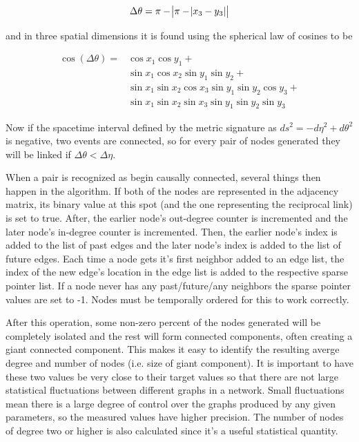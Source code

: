 \documentclass[preprint,notitlepage,amsmath,amssymb,floatfix]{revtex4-1}
\begin{document}
\begin{equation}
\Delta\theta = \pi - \abs{\pi - \abs{x_3 - y_3}}
\end{equation}

\noindent and in three spatial dimensions it is found using the spherical law of cosines to be

\begin{equation}
\begin{split}
\cos\left(\Delta\theta\right) = &\cos x_1\cos y_1 + \\
  &\sin x_1\cos x_2\sin y_1\sin y_2 + \\
  &\sin x_1\sin x_2\cos x_3\sin y_1\sin y_2\cos y_3 + \\
  &\sin x_1\sin x_2\sin x_3\sin y_1\sin y_2\sin y_3
\end{split}
\end{equation}

\noindent Now if the spacetime interval defined by the metric signature as $ds^2 = -d\eta^2 + d\theta^2$ is negative, two events are connected, so for every pair of nodes generated they will be linked if $\Delta\theta < \Delta\eta$.  \par
When a pair is recognized as begin causally connected, several things then happen in the algorithm.
If both of the nodes are represented in the adjacency matrix, its binary value at this spot (and the one representing the reciprocal link) is set to true.
After, the earlier node's out-degree counter is incremented and the later node's in-degree counter is incremented.
Then, the earlier node's index is added to the list of past edges and the later node's index is added to the list of future edges.
Each time a node gets it's first neighbor added to an edge list, the index of the new edge's location in the edge list is added to the respective sparse pointer list.
If a node never has any past/future/any neighbors the sparse pointer values are set to -1.
Nodes must be temporally ordered for this to work correctly. \par
After this operation, some non-zero percent of the nodes generated will be completely isolated and the rest will form connected components, often creating a giant connected component.
This makes it easy to identify the resulting averge degree and number of nodes (i.e. size of giant component).  
It is important to have these two values be very close to their target values so that there are not large statistical fluctuations between different graphs in a network.
Small fluctuations mean there is a large degree of control over the graphs produced by any given parameters, so the measured values have higher precision.
The number of nodes of degree two or higher is also calculated since it's a useful statistical quantity.
\end{document}
